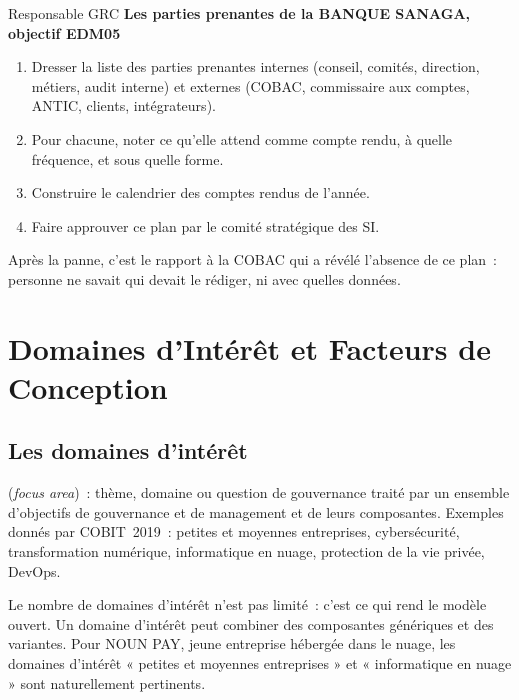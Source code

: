 \begin{boxmetier}{Responsable GRC}
\textbf{Les parties prenantes de la BANQUE SANAGA, objectif EDM05}
\begin{enumerate}
    \item Dresser la liste des parties prenantes internes (conseil,
          comités, direction, métiers, audit interne) et externes (COBAC,
          commissaire aux comptes, ANTIC, clients, intégrateurs).
    \item Pour chacune, noter ce qu'elle attend comme compte rendu, à quelle
          fréquence, et sous quelle forme.
    \item Construire le calendrier des comptes rendus de l'année.
    \item Faire approuver ce plan par le comité stratégique des SI.
\end{enumerate}
Après la panne, c'est le rapport à la COBAC qui a révélé l'absence de ce
plan~: personne ne savait qui devait le rédiger, ni avec quelles données.
\end{boxmetier}

\section{Domaines d'Intérêt et Facteurs de Conception}
\label{sec:c05-focus}

\subsection{Les domaines d'intérêt}

\begin{boxdef}
 (\textit{focus
area})~: thème, domaine ou question de gouvernance traité par un ensemble
d'objectifs de gouvernance et de management et de leurs composantes.
Exemples donnés par COBIT~2019~: petites et moyennes entreprises,
cybersécurité, transformation numérique, informatique en nuage, protection
de la vie privée, DevOps.
\end{boxdef}

Le nombre de domaines d'intérêt n'est pas limité~: c'est ce qui rend le
modèle ouvert. Un domaine d'intérêt peut combiner des composantes
génériques et des variantes. Pour NOUN PAY, jeune entreprise hébergée dans
le nuage, les domaines d'intérêt « petites et moyennes entreprises » et
« informatique en nuage » sont naturellement pertinents.

